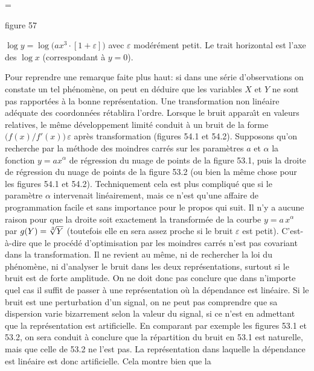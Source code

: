 \midinsert 
\epsfxsize=\hsize
{} 
\vskip-1mm
\centerline{\eightpoint figure 57} 
\vskip3mm 
\centerline{\vbox{\hsize=11cm\eightpoint \noindent
$\log y = \log\big( ax^3 \cdot [1 + \varepsilon ]\big)$ avec 
$\varepsilon$ mod\'er\'ement petit. Le trait horizontal est l'axe des 
$\log x$ (correspondant \`a $y=0$). } } 
\endinsert 

Pour reprendre une remarque faite plus haut: si dans une s\'erie 
d'ob\-ser\-va\-tions on constate un tel ph\'enom\`ene, on peut en d\'eduire 
que les variables $X$ et $Y$ ne sont pas rapport\'ees \`a la bonne 
repr\'esentation. Une transformation non lin\'eaire ad\'equate des 
coordonn\'ees r\'etablira l'ordre. 
\medskip 
Lorsque le bruit appara{\^\i}t en valeurs relatives, le m\^eme 
d\'eveloppement limit\'e conduit \`a un bruit de la forme
$\big( f(x)/f'(x)\big)\, \varepsilon$ apr\`es transformation (figures 54.1
et 54.2). 
\medskip 
Supposons qu'on recherche par la m\'ethode des moindres carr\'es sur
les param\`etres $a$ et $\alpha$ la fonction $y = ax^\alpha$ de 
r\'egression du nuage de points de la figure 53.1, puis la droite de 
r\'egression du nuage de points de la figure 53.2 (ou bien la m\^eme 
chose pour les figures 54.1 et 54.2). Techniquement cela est plus 
compliqu\'e que si le param\`etre $\alpha$ intervenait lin\'eairement, 
mais ce n'est qu'une affaire de programmation facile et sans 
importance pour le propos qui suit. Il n'y a aucune raison pour que la 
droite soit exactement la transform\'ee de la courbe $y=a\, x^\alpha$ par
$g(Y) = \root 3\of {Y}$ (toutefois elle en sera assez proche si le bruit 
$\varepsilon$ est petit). C'est-\`a-dire que le proc\'ed\'e d'optimisation 
par les moindres carr\'es n'est pas covariant dans la transformation. 
Il ne revient au m\^eme, ni de rechercher la loi du ph\'enom\`ene, ni 
d'analyser le bruit dans les deux repr\'esentations, surtout si le bruit 
est de forte amplitude. 
\medskip 
On ne doit donc pas conclure que dans n'importe quel cas {\og il suffit de 
passer \`a une repr\'esentation o\`u la d\'ependance est lin\'eaire\fg}. 
Si le bruit est une perturbation d'un signal, on ne peut pas comprendre 
que sa dispersion varie bizarrement selon la valeur du signal, si ce 
n'est en admettant que la repr\'esentation est artificielle. En comparant 
par exemple les figures 53.1 et 53.2, on sera conduit \`a conclure 
que la r\'epartition du bruit en 53.1 est naturelle, mais que celle de
53.2 ne l'est pas. La repr\'esentation dans laquelle la d\'ependance
est lin\'eaire est donc {\og artificielle\fg}. Cela montre bien que la

